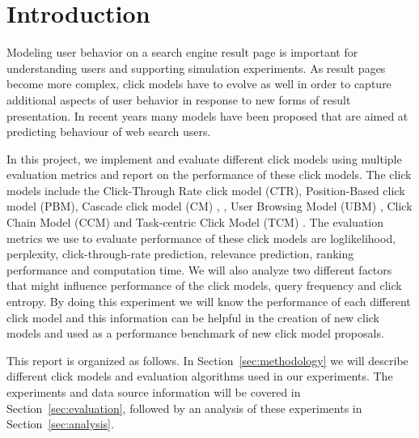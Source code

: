 \section{Introduction}
Modeling user behavior on a search engine result page is important for understanding users and supporting simulation experiments.
As result pages become more complex, click models have to evolve as well in order to capture additional aspects of user behavior in response to new forms of result presentation.
In recent years many models have been proposed that are aimed at predicting behaviour of web search users. 

In this project, we implement and evaluate different click models using multiple evaluation metrics and report on the performance of these click models.
The click models include the Click-Through Rate click model (CTR), Position-Based click model (PBM), Cascade click model (CM) \cite{Kempe2008}, , User Browsing Model (UBM) \cite{Dupret2008}, Click Chain Model (CCM) \cite{Guo2009_CCM} and Task-centric Click Model (TCM) \cite{Zhang2011}.
The evaluation metrics we use to evaluate performance of these click models are loglikelihood, perplexity, click-through-rate prediction, relevance prediction, ranking performance and computation time. We will also analyze two different factors that might influence performance of the click models, query frequency and click entropy.
By doing this experiment we will know the performance of each different click model and this information can be helpful in the creation of new click models and used as a performance benchmark of new click model proposals.

This report is organized as follows.
In Section~\ref{sec:methodology} we will describe different click models and evaluation algorithms used in our experiments.
The experiments and data source information will be covered in Section~\ref{sec:evaluation}, followed by an analysis of these experiments in Section~\ref{sec:analysis}.
